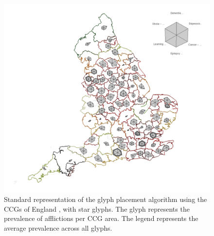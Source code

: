 

%
\begin{figure} \centering
\includegraphics[width=1\textwidth]{images/ch5/CCGgridAFull.png}
\caption{Standard representation of the glyph placement algorithm using the CCGs of England \cite{publicHealthEngland}, with star glyphs. The glyph represents the prevalence of afflictions per CCG area. The legend represents the average prevalence across all glyphs. } \label{fig:sample1}
\end{figure}
